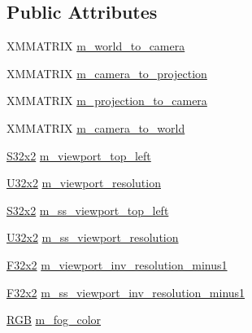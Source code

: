 \subsection*{Public Attributes}
\begin{DoxyCompactItemize}
\item 
X\+M\+M\+A\+T\+R\+IX \hyperlink{structmage_1_1rendering_1_1_camera_buffer_af1ceff883dcc383ce10f2165a5a9a061}{m\+\_\+world\+\_\+to\+\_\+camera}
\item 
X\+M\+M\+A\+T\+R\+IX \hyperlink{structmage_1_1rendering_1_1_camera_buffer_a75669aa0916514b1d414e5a2f7c72c75}{m\+\_\+camera\+\_\+to\+\_\+projection}
\item 
X\+M\+M\+A\+T\+R\+IX \hyperlink{structmage_1_1rendering_1_1_camera_buffer_a9cb9e0e4005d55b72668bbdcf4a27218}{m\+\_\+projection\+\_\+to\+\_\+camera}
\item 
X\+M\+M\+A\+T\+R\+IX \hyperlink{structmage_1_1rendering_1_1_camera_buffer_a0633cfc689f2a097783ecc1626b94590}{m\+\_\+camera\+\_\+to\+\_\+world}
\item 
\hyperlink{namespacemage_a02de5a44f35ee9917e5788d63795fece}{S32x2} \hyperlink{structmage_1_1rendering_1_1_camera_buffer_a7184e2c6407bbf0702631b932f673d07}{m\+\_\+viewport\+\_\+top\+\_\+left}
\item 
\hyperlink{namespacemage_a88e05bff0300120c013285d3dcad95c5}{U32x2} \hyperlink{structmage_1_1rendering_1_1_camera_buffer_a433bdb3d8b4e86fcd04fdb2b794bd0f7}{m\+\_\+viewport\+\_\+resolution}
\item 
\hyperlink{namespacemage_a02de5a44f35ee9917e5788d63795fece}{S32x2} \hyperlink{structmage_1_1rendering_1_1_camera_buffer_a3373440adfd588f0b3aa675210a9b501}{m\+\_\+ss\+\_\+viewport\+\_\+top\+\_\+left}
\item 
\hyperlink{namespacemage_a88e05bff0300120c013285d3dcad95c5}{U32x2} \hyperlink{structmage_1_1rendering_1_1_camera_buffer_a96b17352187228ee2265be33d3f2d159}{m\+\_\+ss\+\_\+viewport\+\_\+resolution}
\item 
\hyperlink{namespacemage_aa87237ad091f5cd7da612b8523fc108f}{F32x2} \hyperlink{structmage_1_1rendering_1_1_camera_buffer_a87dae6d19b7c84d361ff5304cc0fd637}{m\+\_\+viewport\+\_\+inv\+\_\+resolution\+\_\+minus1}
\item 
\hyperlink{namespacemage_aa87237ad091f5cd7da612b8523fc108f}{F32x2} \hyperlink{structmage_1_1rendering_1_1_camera_buffer_a05e17b19f87ca2a5cb5c75cf04e2796c}{m\+\_\+ss\+\_\+viewport\+\_\+inv\+\_\+resolution\+\_\+minus1}
\item 
\hyperlink{structmage_1_1_r_g_b}{R\+GB} \hyperlink{structmage_1_1rendering_1_1_camera_buffer_a6f963e7d607c59ab0dfc3972e06a9739}{m\+\_\+fog\+\_\+color}

\end{DoxyCompactItemize}
